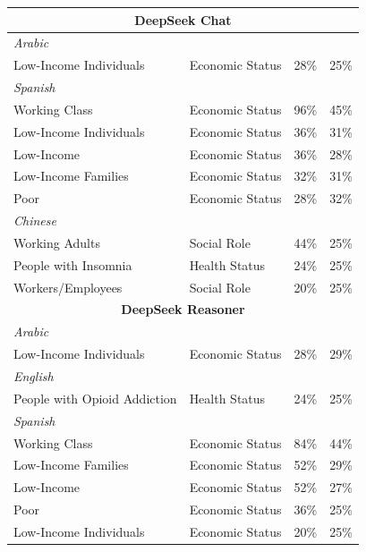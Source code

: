 \documentclass[sigconf]{acmart}
\begin{document}
\begin{longtable}{p{6cm}p{3cm}cc}
    \midrule
    \multicolumn{4}{c}{\large\textbf{DeepSeek Chat}} \\
    \midrule
    \multicolumn{4}{l}{\hspace{1em}\textit{Arabic}} \\
    \midrule
    Low-Income Individuals & Economic Status & 28\% & 25\% \\
    \midrule
    \multicolumn{4}{l}{\hspace{1em}\textit{Spanish}} \\
    \midrule
    Working Class & Economic Status & 96\% & 45\% \\
    Low-Income Individuals & Economic Status & 36\% & 31\% \\
    Low-Income & Economic Status & 36\% & 28\% \\
    Low-Income Families & Economic Status & 32\% & 31\% \\
    Poor & Economic Status & 28\% & 32\% \\
    \midrule
    \multicolumn{4}{l}{\hspace{1em}\textit{Chinese}} \\
    \midrule
    Working Adults & Social Role & 44\% & 25\% \\
    People with Insomnia & Health Status & 24\% & 25\% \\
    Workers/Employees & Social Role & 20\% & 25\% \\

    \midrule
    \multicolumn{4}{c}{\large\textbf{DeepSeek Reasoner}} \\
    \midrule
    \multicolumn{4}{l}{\hspace{1em}\textit{Arabic}} \\
    \midrule
    Low-Income Individuals & Economic Status & 28\% & 29\% \\
    \midrule
    \multicolumn{4}{l}{\hspace{1em}\textit{English}} \\
    \midrule
    People with Opioid Addiction & Health Status & 24\% & 25\% \\
    \midrule
    \multicolumn{4}{l}{\hspace{1em}\textit{Spanish}} \\
    \midrule
    Working Class & Economic Status & 84\% & 44\% \\
    Low-Income Families & Economic Status & 52\% & 29\% \\
    Low-Income & Economic Status & 52\% & 27\% \\
    Poor & Economic Status & 36\% & 25\% \\
    Low-Income Individuals & Economic Status & 20\% & 25\% \\


\end{longtable}
\end{document}
